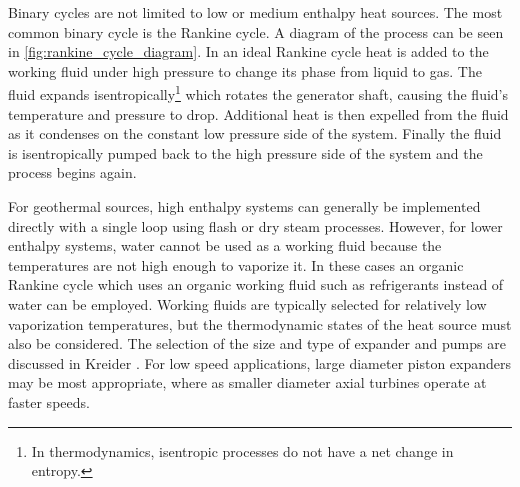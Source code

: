 Binary cycles are not limited to low or medium enthalpy heat sources. The most common binary cycle is the Rankine cycle. A diagram of the process can be seen in \autoref{fig:rankine_cycle_diagram}. In an ideal Rankine cycle heat is added to the working fluid under high pressure to change its phase from liquid to gas. The fluid expands isentropically\footnote{In thermodynamics, isentropic processes do not have a net change in entropy.} which rotates the generator shaft, causing the fluid's temperature and pressure to drop. Additional heat is then expelled from the fluid as it condenses on the constant low pressure side of the system. Finally the fluid is isentropically pumped back to the high pressure side of the system and the process begins again.


For geothermal sources, high enthalpy systems can generally be implemented directly with a single loop using flash or dry steam processes. However, for lower enthalpy systems, water cannot be used as a working fluid because the temperatures are not high enough to vaporize it. In these cases an organic Rankine cycle which uses an organic working fluid such as refrigerants instead of water can be employed. Working fluids are typically selected for relatively low vaporization temperatures, but the thermodynamic states of the heat source must also be considered. The selection of the size and type of expander and pumps are discussed in Kreider \cite{Kreider}. For low speed applications, large diameter piston expanders may be most appropriate, where as smaller diameter axial turbines operate at faster speeds.





